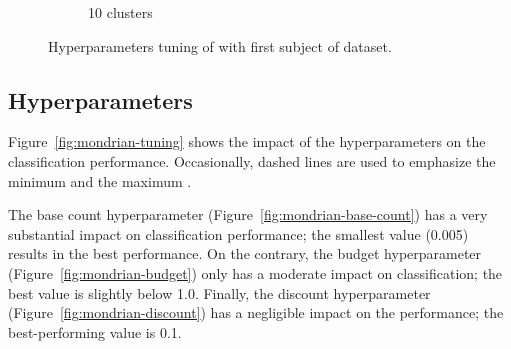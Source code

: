 \begin{figure}
\begin{subfigure}[b]{0.49\textwidth}
		 \caption{10 clusters}
	 \end{subfigure}
	\caption{Hyperparameters tuning of \mcnn with first subject of \banosdataset dataset. }
	\label{fig:mcnn-tuning-error}
\end{figure}

\subsection{\mondrianforest Hyperparameters}

Figure~\ref{fig:mondrian-tuning} shows the impact of the \mondrianforest hyperparameters on
the classification performance. Occasionally, dashed lines are used to
emphasize the minimum and the maximum .

The base count hyperparameter (Figure~\ref{fig:mondrian-base-count}) has a
very substantial impact on classification performance; the smallest value
(0.005) results in the best performance. On the contrary, the
budget hyperparameter (Figure~\ref{fig:mondrian-budget}) only has a
moderate impact on classification; the best value is slightly below
1.0. Finally, the discount hyperparameter
(Figure~\ref{fig:mondrian-discount}) has a negligible impact on the
performance; the best-performing value is 0.1.

